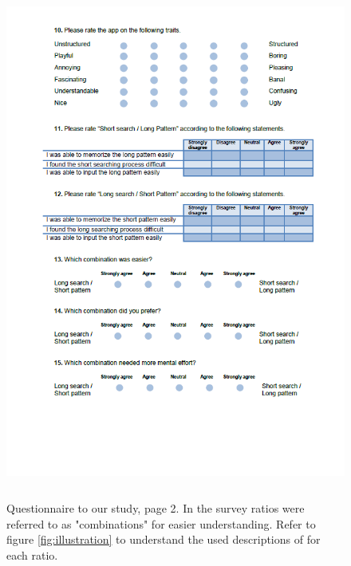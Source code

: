 \begin{figure}[H]
\includegraphics[width=13cm, height=17cm]{Chapters/graphics/survey2.PNG}
\caption{Questionnaire to our study, page 2. In the survey ratios were referred to as "combinations" for easier understanding. Refer to figure \ref{fig:illustration} to understand the used descriptions of for each ratio.}
\label{fig:survey2}
\end{figure}

